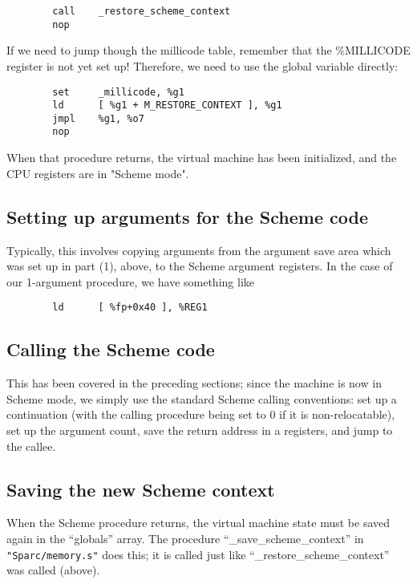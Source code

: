 \begin{verbatim}
        call    _restore_scheme_context
        nop
\end{verbatim}

If we need to jump though the millicode table, remember that the \%MILLICODE
register is not yet set up! Therefore, we need to use the global variable
directly:

\begin{verbatim}
        set     _millicode, %g1
        ld      [ %g1 + M_RESTORE_CONTEXT ], %g1
        jmpl    %g1, %o7
        nop
\end{verbatim}

When that procedure returns, the virtual machine has been initialized, and
the CPU registers are in "Scheme mode".

\subsection{Setting up arguments for the Scheme code}

Typically, this involves copying arguments from the argument save area which
was set up in part (1), above, to the Scheme argument registers. In the case
of our 1-argument procedure, we have something like

\begin{verbatim}
        ld      [ %fp+0x40 ], %REG1
\end{verbatim}

\subsection{Calling the Scheme code}

This has been covered in the preceding sections; since the machine is
now in Scheme mode, we simply use the standard Scheme calling
conventions: set up a continuation (with the calling procedure being
set to 0 if it is non-relocatable), set up the argument count, save the
return address in a registers, and jump to the callee.

\subsection{Saving the new Scheme context}

When the Scheme procedure returns, the virtual machine state must be
saved again in the ``globals'' array. The procedure
``\_save\_scheme\_context'' in \verb+"Sparc/memory.s"+ does this; it
is called just like ``\_restore\_scheme\_context'' was called (above).

